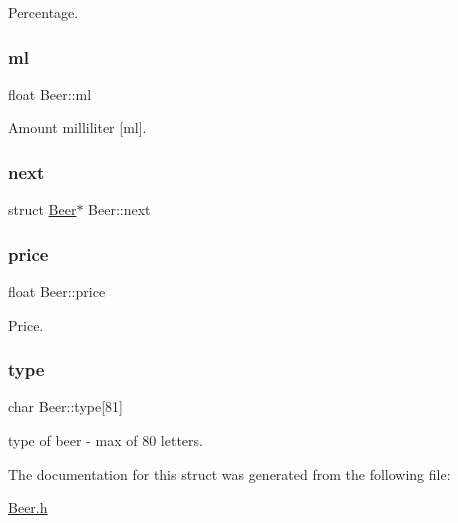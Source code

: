 Percentage. \mbox{\label{struct_beer_a5b628ad8c8ee212136436edc03085680}} 
\subsubsection{\texorpdfstring{ml}{ml}}
{\footnotesize\ttfamily float Beer\+::ml}

Amount milliliter \mbox{[}ml\mbox{]}. \mbox{\label{struct_beer_a02344d6caf206b3530ac86f92e2a91d1}} 
\subsubsection{\texorpdfstring{next}{next}}
{\footnotesize\ttfamily struct \mbox{\hyperlink{struct_beer}{Beer}}$\ast$ Beer\+::next}

\mbox{\label{struct_beer_a3350ff6d199f1d9e9cd4b751fb7659bd}} 
\subsubsection{\texorpdfstring{price}{price}}
{\footnotesize\ttfamily float Beer\+::price}

Price. \mbox{\label{struct_beer_a5176807d2dc4b1e3ccfb62a047c417a1}} 
\subsubsection{\texorpdfstring{type}{type}}
{\footnotesize\ttfamily char Beer\+::type\mbox{[}81\mbox{]}}

type of beer -\/ max of 80 letters. 

The documentation for this struct was generated from the following file\+:\begin{DoxyCompactItemize}
\item 
\mbox{\hyperlink{_beer_8h}{Beer.\+h}}\end{DoxyCompactItemize}
